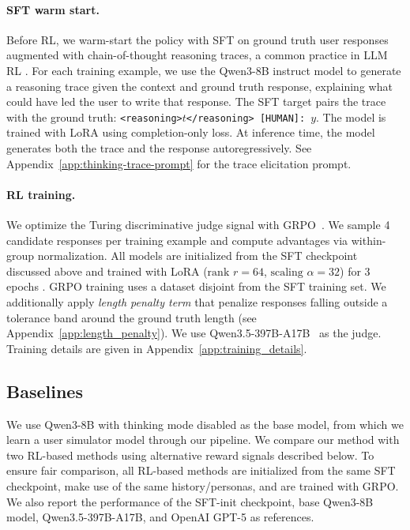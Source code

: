 \documentclass{article} %
\newcommand{\llq}[1]{{\color{cyan}[linlu: #1]}}
\begin{document}
\paragraph{SFT warm start.}
Before RL, we warm-start the policy with SFT on ground truth user responses augmented with chain-of-thought reasoning traces, a common practice in LLM RL \cite[e.g.,][]{guo2025deepseek}. For each training example, we use the Qwen3-8B instruct model to generate a reasoning trace given the context and ground truth response, explaining what could have led the user to write that response. The SFT target pairs the trace with the ground truth: \texttt{<reasoning>}$t$\texttt{</reasoning> [HUMAN]:}~$y$. The model is trained with LoRA using completion-only loss. At inference time, the model generates both the trace and the response autoregressively. See Appendix~\ref{app:thinking-trace-prompt} for the trace elicitation prompt.

\paragraph{RL training.}
We optimize the Turing discriminative judge signal with GRPO~\citep{shao2024deepseekmath}. We sample 4 candidate responses per training example and compute advantages via within-group normalization. All models are initialized from the SFT checkpoint discussed above and trained with LoRA ($\text{rank }{r=}64$, $\text{scaling }\alpha{=}32$) for 3 epochs \citep{lora, qlora}. GRPO training uses a dataset disjoint from the SFT training set.
We  additionally apply \emph{length penalty term} that penalize responses falling outside a tolerance band around the ground truth length (see Appendix~\ref{app:length_penalty}). We use Qwen3.5-397B-A17B~\citep{qwenteam2026qwen35omni} as the judge. Training details are given in Appendix~\ref{app:training_details}. 

\subsection{Baselines}

We use Qwen3-8B with thinking mode disabled as the base model, from which we learn a user simulator model through our pipeline. We compare our method with two RL-based methods using alternative reward signals described below. To ensure fair comparison, all RL-based methods are initialized from the same SFT checkpoint, make use of the same history/personas, and are trained with GRPO. We also report the performance of the SFT-init checkpoint, base Qwen3-8B model, Qwen3.5-397B-A17B, and OpenAI GPT-5 as references.
\end{document}
